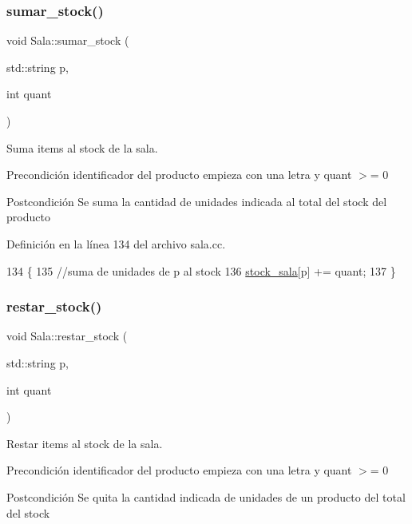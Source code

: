 \subsubsection{\texorpdfstring{sumar\+\_\+stock()}{sumar\_stock()}}
{\footnotesize\ttfamily void Sala\+::sumar\+\_\+stock (\begin{DoxyParamCaption}\item[{std\+::string}]{p,  }\item[{int}]{quant }\end{DoxyParamCaption})}



Suma items al stock de la sala. 

\begin{DoxyPrecond}{Precondición}
identificador del producto empieza con una letra y quant $>$= 0 
\end{DoxyPrecond}
\begin{DoxyPostcond}{Postcondición}
Se suma la cantidad de unidades indicada al total del stock del producto 
\end{DoxyPostcond}


Definición en la línea 134 del archivo sala.\+cc.


\begin{DoxyCode}
134                                           \{
135     \textcolor{comment}{//suma de unidades de p al stock}
136     \mbox{\hyperlink{class_sala_a7c9511997ba4a6fac93625fd3f5c7703}{stock\_sala}}[p] += quant;
137 \}
\end{DoxyCode}
\mbox{\label{class_sala_a3f2485d40f7d90ca5eb8142dbadd5993}} 
\subsubsection{\texorpdfstring{restar\+\_\+stock()}{restar\_stock()}}
{\footnotesize\ttfamily void Sala\+::restar\+\_\+stock (\begin{DoxyParamCaption}\item[{std\+::string}]{p,  }\item[{int}]{quant }\end{DoxyParamCaption})}



Restar items al stock de la sala. 

\begin{DoxyPrecond}{Precondición}
identificador del producto empieza con una letra y quant $>$= 0 
\end{DoxyPrecond}
\begin{DoxyPostcond}{Postcondición}
Se quita la cantidad indicada de unidades de un producto del total del stock 
\end{DoxyPostcond}


